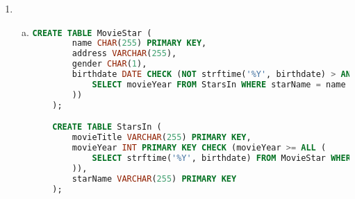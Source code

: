 \documentclass[12pt]{article}
\begin{document}
\begin{enumerate}[1.]
    \item

    \begin{enumerate}[a)]
        \item
    \begin{lstlisting}[language=SQL]
    CREATE TABLE MovieStar (
        name CHAR(255) PRIMARY KEY,
        address VARCHAR(255),
        gender CHAR(1),
        birthdate DATE CHECK (NOT strftime('%Y', birthdate) > ANY (
            SELECT movieYear FROM StarsIn WHERE starName = name
        ))
    );

    CREATE TABLE StarsIn (
        movieTitle VARCHAR(255) PRIMARY KEY,
        movieYear INT PRIMARY KEY CHECK (movieYear >= ALL (
            SELECT strftime('%Y', birthdate) FROM MovieStar WHERE starName = name
        )),
        starName VARCHAR(255) PRIMARY KEY
    );
    \end{lstlisting}
    \end{enumerate}

\end{enumerate}
\end{document}

